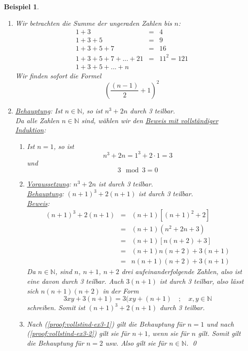 \documentclass{report}
\newtheorem{myexample}{Beispiel}
\begin{document}
\begin{myexample}
\begin{enumerate}
\begin{enumerate}
Also gilt sie für $n = 2$ und nach (\ref{proof:vollstind-ex1-2}) für $n+1$, ist 3 usw. Also gilt die Behauptung für alle $n \in \mathbb{N}$.\qed
\end{enumerate}
\item Wir betrachten die Summe der ungeraden Zahlen bis $n$:
\begin{eqnarray}1 + 3 & = & 4 \nonumber \\
1 + 3 + 5 & = & 9 \nonumber \\
1 + 3 + 5 + 7 & = & 16 \nonumber \\
1 + 3 + 5 + 7 + ... + 21 & = & 11^2 = 121 \nonumber \\
1 + 3 + 5 + ... + n\end{eqnarray} Wir finden sofort die Formel
\begin{equation}(\frac{(n-1)}{2} + 1)^2\end{equation}
\item \underline{Behauptung}: Ist $n \in \mathbb{N}$, so ist $n^3+2n$ durch 3 teilbar.\\
Da alle Zahlen $n \in \mathbb{N}$ sind, wählen wir den \underline{Beweis mit vollständiger Induktion}: \begin{enumerate}\item \label{proof:vollstind-ex3-1} Ist $n = 1$, so ist
\begin{equation}n^3+2n = 1^3 + 2 \cdot 1 = 3\end{equation} und
\begin{equation}3 \mod{3} = 0\end{equation}
\item \label{proof:vollstind-ex3-2}\underline{Voraussetzung}: $n^3 + 2n$ ist durch 3 teilbar.\\
\underline{Behauptung}: $(n+1)^3 + 2(n+1)$ ist durch 3 teilbar.\\
\underline{Beweis}: \begin{eqnarray}(n+1)^3 + 2(n+1) & = & (n+1)[(n+1)^2 + 2] \nonumber \\
&=&(n+1)(n^2 + 2n + 3) \nonumber \\
&=&(n+1)[n(n+2)+3] \nonumber \\
&=&(n+1)n(n+2) + 3(n+1) \nonumber \\
&=&n(n+1)(n+2) + 3(n+1)\end{eqnarray}
Da $n \in \mathbb{N}$, sind $n$, $n+1$, $n+2$ drei aufeinanderfolgende Zahlen, also ist eine davon durch 3 teilbar. Auch $3(n+1)$ ist durch 3 teilbar, also lässt sich $n(n+1)(n+2)$ in der Form
\begin{equation}3xy + 3(n+1) = 3(xy + (n+1)\quad;\quad x,y \in \mathbb{N}\end{equation}
schreiben. Somit ist $(n+1)^3 + 2(n+1)$ durch 3 teilbar.
\item Nach (\ref{proof:vollstind-ex3-1}) gilt die Behauptung für $n = 1$ und nach (\ref{proof:vollstind-ex3-2}) gilt sie für $n + 1$, wenn sie für $n$ gilt. Somit gilt die Behauptung für $n = 2$ usw. Also gilt sie für $n \in \mathbb{N}$. \qed\end{enumerate}\end{enumerate}\end{myexample}
\end{document}
